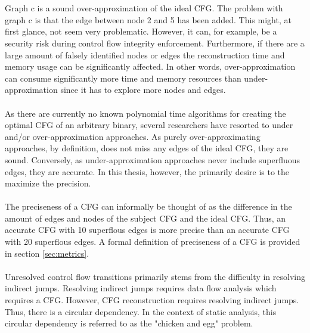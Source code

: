 \documentclass{kththesis}
\begin{document}
\\ \\
Graph c is a sound over-approximation of the ideal CFG. The problem with graph c is that the edge between node 2 and 5 has been added. This might, at first glance, not seem very problematic. However, it can, for example, be a security risk during control flow integrity enforcement. Furthermore, if there are a large amount of falsely identified nodes or edges the reconstruction time and memory usage can be significantly affected. In other words, over-approximation can consume significantly more time and memory resources than under-approximation since it has to explore more nodes and edges\cite{alternating}.
\\ \\
As there are currently no known polynomial time algorithms for creating the optimal CFG of an arbitrary binary, several researchers have resorted to under and/or over-approximation approaches\cite{preciseCFGBoolean}\cite{preciseCFG}\cite{CFGFromPowerPC}\cite{angr}. As purely over-approximating approaches, by definition, does not miss any edges of the ideal CFG, they are sound. Conversely, as under-approximation approaches never include superfluous edges, they are accurate. In this thesis, however, the primarily desire is to the maximize the precision.
\\ \\
The preciseness of a CFG can informally be thought of as the difference in the amount of edges and nodes of the subject CFG and the ideal CFG. Thus, an accurate CFG with 10 superflous edges is more precise than an accurate CFG with 20 superflous edges. A formal definition of preciseness of a CFG is provided in section \ref{sec:metrics}.
\\ \\
Unresolved control flow transitions primarily stems from the difficulty in resolving indirect jumps. Resolving indirect jumps requires data flow analysis which requires a CFG. However, CFG reconstruction requires resolving indirect jumps. Thus, there is a circular dependency. In the context of static analysis, this circular dependency is referred to as the "chicken and egg" problem\cite{Jakstab}.
\end{document}

